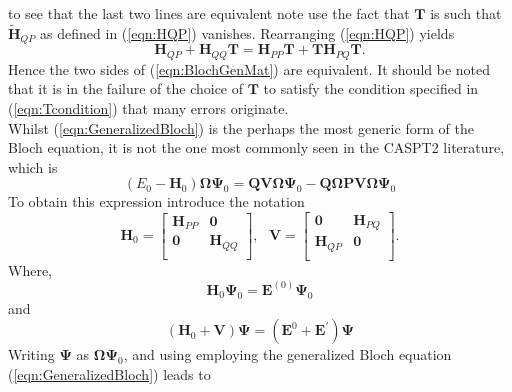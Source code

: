 to see that the last two lines are equivalent note use the fact that $\mathbf{T}$ is such that $\tilde{\mathbf{H}}_{QP}$ 
as defined in (\ref{eqn:HQP}) vanishes. Rearranging (\ref{eqn:HQP}) yields 
\begin{equation*}
\mathbf{H}_{QP} + \mathbf{H}_{QQ}\mathbf{T} = \mathbf{\mathbf{H}}_{PP}\mathbf{T} + \mathbf{T}\mathbf{H}_{PQ}\mathbf{T}.
\label{eqn:Tcondition}
\end{equation*}
Hence the two sides of (\ref{eqn:BlochGenMat}) are equivalent. It should be noted that it is in the 
failure of the choice of $\mathbf{T}$ to satisfy the condition specified in (\ref{eqn:Tcondition}) 
that many errors originate.\\

\noindent Whilst (\ref{eqn:GeneralizedBloch}) is the perhaps the most generic form of the Bloch equation,
it is not the one most commonly seen in the CASPT2 literature, which is 
\begin{equation}
(E_{0} - \mathbf{H}_{0})\mathbf{\Omega} \boldsymbol{\Psi}_{0} =
 \mathbf{Q}\mathbf{V}\boldsymbol{\Omega}\boldsymbol{\Psi}_{0}- 
 \mathbf{Q}\boldsymbol{\Omega}\mathbf{P}\mathbf{V}\boldsymbol{\Omega}\boldsymbol{\Psi}_{0} 
\end{equation}
To obtain this expression introduce the notation
\begin{equation}
\mathbf{H}_{0}=
\begin{bmatrix}
\mathbf{H}_{PP} & \mathbf{0} \\
\mathbf{0} & \mathbf{H}_{QQ} \\
\end{bmatrix},
\text{ \ \ \ \ }
\mathbf{V} =
\begin{bmatrix}
\mathbf{0} & \mathbf{H}_{PQ} \\
\mathbf{H}_{QP} & \mathbf{0} \\
\end{bmatrix}.
\label{eqn:MatToAlgBloch}
\end{equation}
Where, 
\begin{equation}
\mathbf{H}_{0}\mathbf{\Psi}_{0} = \mathbf{E}^{(0)}\mathbf{\Psi}_{0}
\label{eqn:unperturbedHE}
\end{equation}
and 
\begin{equation}
(\mathbf{H}_{0}+\mathbf{V})\mathbf{\Psi} = (\mathbf{E}^{0}+\mathbf{E}^{'})\mathbf{\Psi}
\label{eqn:perturbedHE}
\end{equation}
Writing $\boldsymbol{\Psi}$ as $\boldsymbol{\Omega}\boldsymbol{\Psi}_{0}$, and using employing the generalized Bloch equation (\ref{eqn:GeneralizedBloch}) leads to
